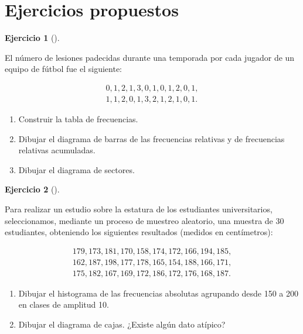 \documentclass[
  a4paper,
]{scrreport}
\theoremstyle{definition}
\newtheorem{exercise}{Ejercicio}[chapter]
\theoremstyle{remark}
\begin{document}
\section{Ejercicios propuestos}\label{ejercicios-propuestos-2}

\begin{exercise}[]\protect\hypertarget{exr-frecuencias-graficos-lesiones}{}\label{exr-frecuencias-graficos-lesiones}

El número de lesiones padecidas durante una temporada por cada jugador
de un equipo de fútbol fue el siguiente:

\[
\begin{array}{c}
0, 1, 2, 1, 3, 0, 1, 0, 1, 2, 0, 1, \\
1, 1, 2, 0, 1, 3, 2, 1, 2, 1, 0, 1.
\end{array}
\]

\begin{enumerate}
\def\labelenumi{\alph{enumi}.}
\item
  Construir la tabla de frecuencias.
\item
  Dibujar el diagrama de barras de las frecuencias relativas y de
  frecuencias relativas acumuladas.
\item
  Dibujar el diagrama de sectores.
\end{enumerate}

\end{exercise}

\begin{exercise}[]\protect\hypertarget{exr-frecuencias-graficos-estaturas}{}\label{exr-frecuencias-graficos-estaturas}

Para realizar un estudio sobre la estatura de los estudiantes
universitarios, seleccionamos, mediante un proceso de muestreo
aleatorio, una muestra de 30 estudiantes, obteniendo los siguientes
resultados (medidos en centímetros):

\[
\begin{array}{c}
179, 173, 181, 170, 158, 174, 172, 166, 194, 185,\\
162, 187, 198, 177, 178, 165, 154, 188, 166, 171,\\
175, 182, 167, 169, 172, 186, 172, 176, 168, 187.
\end{array}
\]

\begin{enumerate}
\def\labelenumi{\alph{enumi}.}
\item
  Dibujar el histograma de las frecuencias absolutas agrupando desde 150
  a 200 en clases de amplitud 10.
\item
  Dibujar el diagrama de cajas. ¿Existe algún dato atípico?
\end{enumerate}

\end{exercise}
\end{document}
